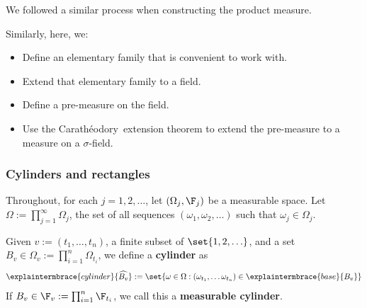 \documentclass{article} %
\newcommand{\Caratheodory}{Carath\'eodory}
\newcommand{\cylinder}[1]{\widehat{#1}}
\begin{document}
We followed a similar process when constructing the product measure.   

Similarly, here, we:
\begin{itemize}
\item Define an elementary family that is convenient to work with.
\item Extend that elementary family to a field.
\item Define a pre-measure on the field.
\item Use the \Caratheodory~extension theorem to extend the pre-measure to a measure on a $\sigma$-field. 	
\end{itemize}


\subsubsection{Cylinders and rectangles}
Throughout, for each $j=1,2,\hdots$, let $(\Omega_j, \F_j)$ be a measurable space.  Let $\Omega := \prod_{j=1}^\infty \Omega_j$, the set of all sequences $(\omega_1, \omega_2, \hdots)$ such that $\omega_j \in \Omega_j$. 



\begingroup
\makeatletter
{}
\makeatother

\begin{definition}
Given $v:=(t_1, \hdots, t_n)$, a finite subset of $\set{1,2,\hdots}$, and a set $B_v \in \Omega_v := \prod_{i=1}^n \Omega_{t_i}$, we define a \textbf{cylinder} as
\begin{align}
 \explaintermbrace{cylinder}{\cylinder{B_v}} := \set{\omega \in \Omega : (\omega_{t_1}, \hdots \omega_{t_n}) \in \explaintermbrace{base}{B_v}}  
\label{eqn:cylinder_in_sequence_space}	
\end{align}
If $B_v \in \F_v := \prod_{i=1}^n \F_{t_i}$, we call this a \textbf{measurable cylinder}.
\end{definition}
\endgroup
\end{document}
